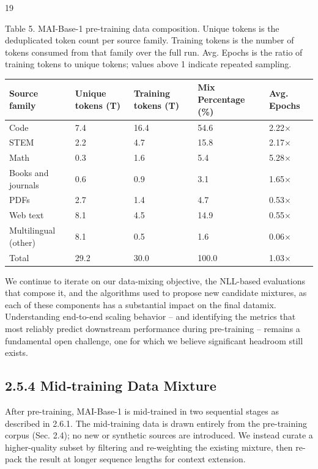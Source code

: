 \documentclass[
  10
]{article}
\newcounter{none} %
\begin{document}
19

Table 5. MAI-Base-1 pre-training data composition. Unique tokens is the
deduplicated token count per source family. Training tokens is the
number of tokens consumed from that family over the full run. Avg.
Epochs is the ratio of training tokens to unique tokens; values above 1
indicate repeated sampling.

{\def\LTcaptype{none} %
\begin{longtable}[]{@{}|l|l|l|l|l|@{}}
\toprule\noalign{}
\endhead
\bottomrule\noalign{}
\endlastfoot
\hline
Source family & Unique tokens (T) & Training tokens (T) & Mix Percentage
(\%) & Avg. Epochs \\
\hline
Code & 7.4 & 16.4 & 54.6 & 2.22× \\
\hline
STEM & 2.2 & 4.7 & 15.8 & 2.17× \\
\hline
Math & 0.3 & 1.6 & 5.4 & 5.28× \\
\hline
Books and journals & 0.6 & 0.9 & 3.1 & 1.65× \\
\hline
PDFs & 2.7 & 1.4 & 4.7 & 0.53× \\
\hline
Web text & 8.1 & 4.5 & 14.9 & 0.55× \\
\hline
Multilingual (other) & 8.1 & 0.5 & 1.6 & 0.06× \\
\hline
Total & 29.2 & 30.0 & 100.0 & 1.03× \\
\hline
\end{longtable}
}

We continue to iterate on our data-mixing objective, the NLL-based
evaluations that compose it, and the algorithms used to propose new
candidate mixtures, as each of these components has a substantial impact
on the final datamix. Understanding end-to-end scaling behavior -- and
identifying the metrics that most reliably predict downstream
performance during pre-training -- remains a fundamental open challenge,
one for which we believe significant headroom still exists.

\subsection{2.5.4 Mid‐training Data
Mixture}\label{midtraining-data-mixture}

After pre-training, MAI-Base-1 is mid-trained in two sequential stages
as described in 2.6.1. The mid-training data is drawn entirely from the
pre-training corpus (Sec. 2.4); no new or synthetic sources are
introduced. We instead curate a higher-quality subset by filtering and
re-weighting the existing mixture, then re-pack the result at longer
sequence lengths for context extension.
\end{document}
